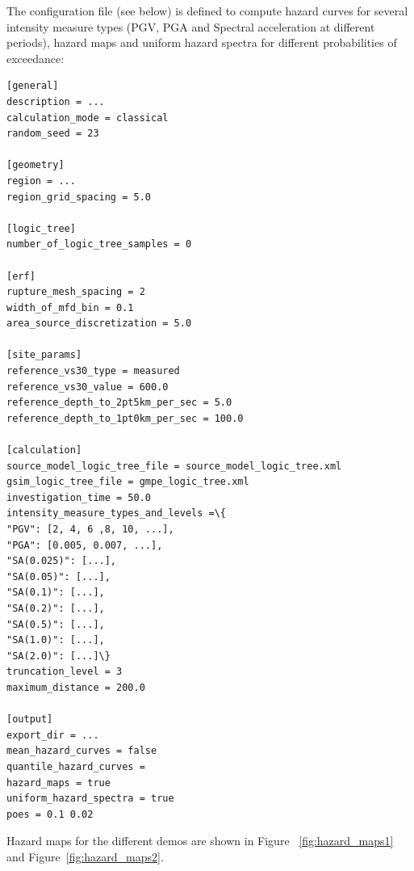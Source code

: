 The configuration file (see below) is defined to compute hazard curves for
several intensity measure types (PGV, PGA and Spectral acceleration at
different periods), hazard maps and uniform hazard spectra for different
probabilities of exceedance:

\begin{Verbatim}[frame=single, commandchars=\\\{\}, fontsize=\normalsize]
[general]
description = ...
calculation_mode = classical
random_seed = 23

[geometry]
region = ...
region_grid_spacing = 5.0

[logic_tree]
number_of_logic_tree_samples = 0

[erf]
rupture_mesh_spacing = 2
width_of_mfd_bin = 0.1
area_source_discretization = 5.0

[site_params]
reference_vs30_type = measured
reference_vs30_value = 600.0
reference_depth_to_2pt5km_per_sec = 5.0
reference_depth_to_1pt0km_per_sec = 100.0

[calculation]
source_model_logic_tree_file = source_model_logic_tree.xml
gsim_logic_tree_file = gmpe_logic_tree.xml
investigation_time = 50.0
intensity_measure_types_and_levels =\{
"PGV": [2, 4, 6 ,8, 10, ...], 
"PGA": [0.005, 0.007, ...], 
"SA(0.025)": [...], 
"SA(0.05)": [...],
"SA(0.1)": [...], 
"SA(0.2)": [...], 
"SA(0.5)": [...], 
"SA(1.0)": [...],
"SA(2.0)": [...]\}
truncation_level = 3
maximum_distance = 200.0

[output]
export_dir = ...
mean_hazard_curves = false
quantile_hazard_curves =
hazard_maps = true
uniform_hazard_spectra = true
poes = 0.1 0.02
\end{Verbatim}

Hazard maps for the different demos are shown in Figure~
\ref{fig:hazard_maps1} and Figure~\ref{fig:hazard_maps2}.

